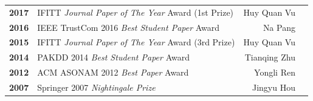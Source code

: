 \documentclass{tikzposter} %
\begin{document}
\begin{columns}
{\begin{minipage}{\linewidth}
\begin{tabular}{ r | l | r  r }
\textbf{2017} & IFITT \textit{Journal Paper of The Year} Award (1st Prize) & Huy Quan Vu &  \\

\textbf{2016} & IEEE TrustCom 2016 \textit{Best Student Paper} Award & Na Pang &  \\

\textbf{2015} & IFITT \textit{Journal Paper of The Year} Award (3rd Prize) & Huy Quan Vu &  \\

\textbf{2014} & PAKDD 2014 \textit{Best Student Paper} Award & Tianqing Zhu &  \\

\textbf{2012} & ACM ASONAM 2012  \textit{Best Paper} Award & Yongli Ren &  \\

\textbf{2007} & Springer 2007 \textit{Nightingale Prize} & Jingyu Hou &  \\
\bottomrule
\end{tabular}
\end{minipage}
}



\end{columns}
\end{document}
